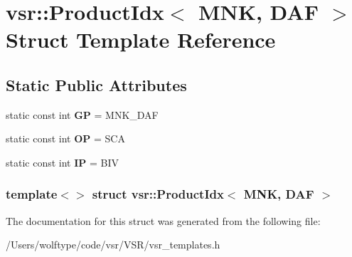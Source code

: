 \hypertarget{structvsr_1_1_product_idx_3_01_m_n_k_00_01_d_a_f_01_4}{\section{vsr\-:\-:Product\-Idx$<$ M\-N\-K, D\-A\-F $>$ Struct Template Reference}
\label{structvsr_1_1_product_idx_3_01_m_n_k_00_01_d_a_f_01_4}
}
\subsection*{Static Public Attributes}
\begin{DoxyCompactItemize}
\item 
\hypertarget{structvsr_1_1_product_idx_3_01_m_n_k_00_01_d_a_f_01_4_a6e373bb07e1902edc5019ef4c6f526c6}{static const int {\bfseries G\-P} = M\-N\-K\-\_\-\-D\-A\-F}\label{structvsr_1_1_product_idx_3_01_m_n_k_00_01_d_a_f_01_4_a6e373bb07e1902edc5019ef4c6f526c6}

\item 
\hypertarget{structvsr_1_1_product_idx_3_01_m_n_k_00_01_d_a_f_01_4_ad9b2ff89c1448f922b6d8855971966f0}{static const int {\bfseries O\-P} = S\-C\-A}\label{structvsr_1_1_product_idx_3_01_m_n_k_00_01_d_a_f_01_4_ad9b2ff89c1448f922b6d8855971966f0}

\item 
\hypertarget{structvsr_1_1_product_idx_3_01_m_n_k_00_01_d_a_f_01_4_a4c4a0b672068e41807ea47829ca17f05}{static const int {\bfseries I\-P} = B\-I\-V}\label{structvsr_1_1_product_idx_3_01_m_n_k_00_01_d_a_f_01_4_a4c4a0b672068e41807ea47829ca17f05}

\end{DoxyCompactItemize}
\subsubsection*{template$<$$>$ struct vsr\-::\-Product\-Idx$<$ M\-N\-K, D\-A\-F $>$}



The documentation for this struct was generated from the following file\-:\begin{DoxyCompactItemize}
\item 
/\-Users/wolftype/code/vsr/\-V\-S\-R/vsr\-\_\-templates.\-h\end{DoxyCompactItemize}
